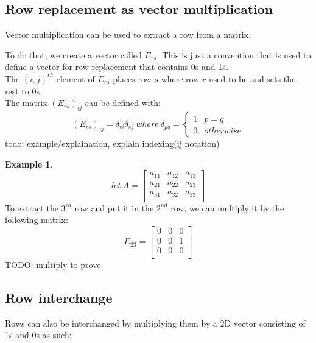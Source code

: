 \documentclass[table]{article}
\theoremstyle{definition}
\newtheorem{ex}{Example}[section]
\begin{document}
  \subsection{Row replacement as vector multiplication}
  Vector multiplication can be used to extract a row from a matrix.

  To do that, we create a vector called $E_{rs}$. This is just a convention that is used to define a vector for row replacement that contains 0s and 1s.\\
  The $(i,j)^{th}$ element of $E_{rs}$ places row $s$ where row $r$ used to be and sets the rest to 0s. \\
  The matrix $(E_{rs})_{ij}$ can be defined with:
  \[(E_{rs})_{ij} = \delta_{ri} \delta_{sj}\ where\ \delta_{pq} = \begin{cases} 1 & p = q \\
    0 & otherwise
  \end{cases} \]
  todo: example/explaination, explain indexing(ij notation)

  \begin{ex}
    \begin{equation}
      let\ A =   \begin{bmatrix}
        a_{11} & a_{12} & a_{13} \\
        a_{21} & a_{22} & a_{23} \\
        a_{31} & a_{32} & a_{33} \\
        \end{bmatrix}
    \end{equation}
    To extract the $3^{rd}$ row and put it in the $2^{nd}$ row, we can multiply it by the following matrix:
    \begin{equation}
      E_{23} =   \begin{bmatrix}
        0 & 0 & 0 \\
        0 & 0 & 1 \\
        0 & 0 & 0 \\
        \end{bmatrix}
    \end{equation}
    TODO: multiply to prove
  \end{ex}

  \subsection{Row interchange}
  Rows can also be interchanged by multiplying them by a 2D vector consisting of 1s and 0s as such:
\end{document}
